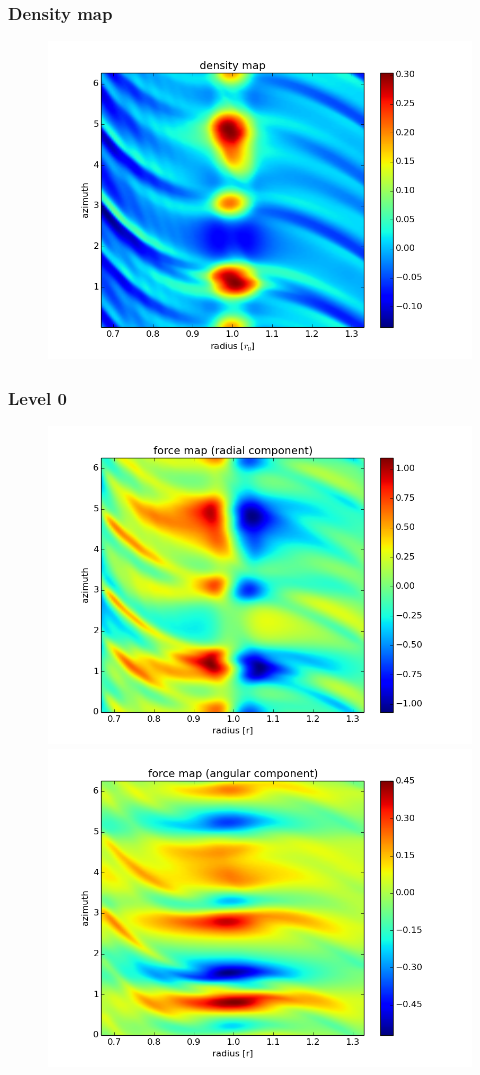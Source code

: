 \documentclass{beamer}
\begin{document}
\begin{frame}
 \frametitle{Density map}
 \begin{figure}[H]
  \centering
  \includegraphics[width=.8\textwidth]{density.png}
 \end{figure} 
\end{frame}
\begin{frame}
 \frametitle{Level 0}
 \begin{figure}[H]
  \centering
  \includegraphics[width=.5\textwidth]{radial_force.png} \includegraphics[width=.5\textwidth]{angular_force.png}
 \end{figure} 
\end{frame}
\end{document}
